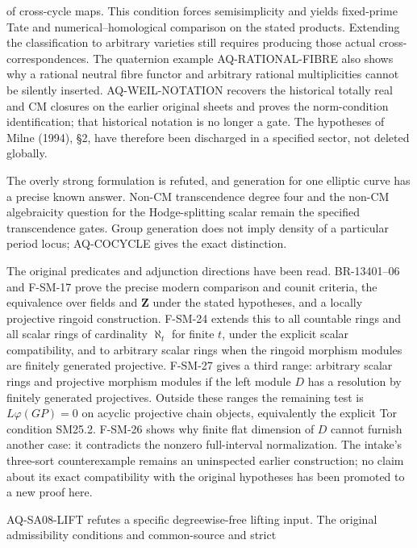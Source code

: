 \begin{description}[style=nextline,leftmargin=0pt]
of cross-cycle maps. This condition forces semisimplicity and yields
fixed-prime Tate and numerical--homological comparison on the stated
products. Extending the classification to arbitrary varieties still
requires producing those actual cross-correspondences. The
quaternion example AQ-RATIONAL-FIBRE also shows why a rational neutral
fibre functor and arbitrary rational multiplicities cannot be silently
inserted. AQ-WEIL-NOTATION recovers the historical totally real and CM
closures on the earlier original sheets and proves the norm-condition
identification; that historical notation is no longer a gate.
The hypotheses of Milne (1994), \S2, have therefore been
discharged in a specified sector, not deleted globally.
\item[Cote 18, scans 11--13 and 59: period density.]
The overly strong formulation is refuted, and generation for one
elliptic curve has a precise known answer. Non-CM transcendence degree
four and the non-CM algebraicity question for the Hodge-splitting
scalar remain the specified transcendence gates. Group generation
does not imply density of a particular period locus; AQ-COCYCLE
gives the exact distinction.
\item[Cote 134-8, scans 47--54: the linear theorem.]
The original predicates and adjunction directions have been read.
BR-13401--06 and F-SM-17 prove the precise modern comparison and
counit criteria, the equivalence over fields and \(\mathbf Z\) under
the stated hypotheses, and a locally projective ringoid construction.
F-SM-24 extends this to all countable rings and all scalar rings of
cardinality $\aleph_t$ for finite $t$, under the explicit scalar
compatibility, and to arbitrary scalar rings when the ringoid morphism
modules are finitely generated projective. F-SM-27 gives a third range:
arbitrary scalar rings and projective morphism modules if the left
module $D$ has a resolution by finitely generated projectives.
Outside these ranges the remaining test is
\(L\varphi(GP)=0\) on acyclic projective chain objects, equivalently
the explicit Tor condition SM25.2. F-SM-26 shows why finite flat
dimension of $D$ cannot furnish another case: it contradicts the
nonzero full-interval normalization. The intake's
three-sort counterexample remains an uninspected earlier construction;
no claim about its exact compatibility with the original hypotheses
has been promoted to a new proof here.
\item[SA08, cote 136/117--121: strict PD sources and localization.]
AQ-SA08-LIFT refutes a specific degreewise-free lifting input.
The original admissibility conditions and common-source and strict

\end{description}
